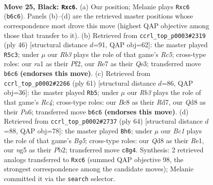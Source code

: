 \documentclass[11pt]{article}
\begin{document}
\clearpage

\begin{figure}[p]\centering
\begin{subfigure}{0.46\textwidth}\centering
\resizebox{\linewidth}{!}{%
\newchessgame
\chessboard[
  setfen={2bq1k2/Q1p1rp1p/PrP2n2/3p2N1/5P2/B7/2P3P1/R4RK1 b - - 2 25},
  showmover=false,
  pgfstyle=straightmove, color=movearrow, markmove={b6-c6}
]}
\caption{}
\end{subfigure}\hfill
\begin{subfigure}{0.46\textwidth}\centering
\resizebox{\linewidth}{!}{%
\newchessgame
\chessboard[
  setfen={r3r1k1/4pb1p/2p2p2/p1R3p1/3NP3/qP2Q2P/5PP1/2R3K1 w - - 0 24},
  showmover=false,
  pgfstyle=straightmove, color=movearrow, markmove={c5-c3}
]}
\caption{}
\end{subfigure}
\\[4pt]
\begin{subfigure}{0.46\textwidth}\centering
\resizebox{\linewidth}{!}{%
\newchessgame
\chessboard[
  setfen={3b2k1/1p1r3n/p3q1pp/P1r1p3/1N6/3PQR1P/1P4PB/5R1K b - - 2 31},
  showmover=false,
  pgfstyle=straightmove, color=movearrow, markmove={c5-b5}
]}
\caption{}
\end{subfigure}\hfill
\begin{subfigure}{0.46\textwidth}\centering
\resizebox{\linewidth}{!}{%
\newchessgame
\chessboard[
  setfen={1r3rk1/p4pb1/2qP1Rp1/2p1p1B1/p2nN3/7P/1P1Q2PK/4R3 w - - 6 33},
  showmover=false,
  pgfstyle=straightmove, color=movearrow, markmove={g5-h6}
]}
\caption{}
\end{subfigure}
\caption{\textbf{Move 25, Black: \texttt{Rxc6}.} (a) Our position; Melanie plays \texttt{Rxc6} (\texttt{b6c6}). Panels (b)--(d) are the retrieved master positions whose correspondence most drove this move (highest QAP objective among those that transfer to it). (b) Retrieved from \texttt{ccrl\_top\_p0003\#2319} (ply 46) [structural distance $d$=91, QAP obj=62]: the master played \texttt{R5c3}; under $\mu$ our \emph{Rb3} plays the role of that game's \emph{Rc5}; cross-type roles: our \emph{r}a1 as their \emph{P}f2, our \emph{R}e7 as their \emph{Q}e3; transferred move \texttt{b6c6} \textbf{(endorses this move)}. (c) Retrieved from \texttt{ccrl\_top\_p0002\#2266} (ply 61) [structural distance $d$=86, QAP obj=36]: the master played \texttt{Rb5}; under $\mu$ our \emph{Rb3} plays the role of that game's \emph{Rc4}; cross-type roles: our \emph{B}c8 as their \emph{R}d7, our \emph{Q}d8 as their \emph{P}a6; transferred move \texttt{b6c6} \textbf{(endorses this move)}. (d) Retrieved from \texttt{ccrl\_top\_p0002\#2737} (ply 64) [structural distance $d$=88, QAP obj=78]: the master played \texttt{Bh6}; under $\mu$ our \emph{Bc1} plays the role of that game's \emph{Bg5}; cross-type roles: our \emph{Q}d8 as their \emph{R}e1, our \emph{n}g5 as their \emph{P}b2; transferred move \texttt{c8g4}. Synthesis: 2 retrieved analogs transferred to \texttt{Rxc6} (summed QAP objective 98, the strongest correspondence among the candidate moves); Melanie committed it via the \texttt{search} selector.}
\label{fig:thought-m49}
\end{figure}
\end{document}
